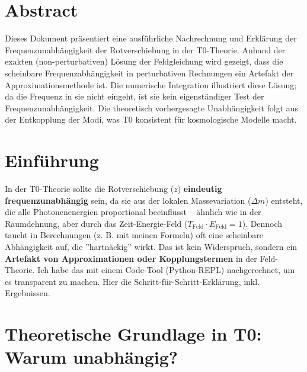 \section*{Abstract}
		Dieses Dokument präsentiert eine ausführliche Nachrechnung und Erklärung der Frequenzunabhängigkeit der Rotverschiebung in der T0-Theorie. Anhand der exakten (non-perturbativen) Lösung der Feldgleichung wird gezeigt, dass die scheinbare Frequenzabhängigkeit in perturbativen Rechnungen ein Artefakt der Approximationsmethode ist. Die numerische Integration illustriert diese Lösung; da die Frequenz in sie nicht eingeht, ist sie kein eigenständiger Test der Frequenzunabhängigkeit. Die theoretisch vorhergesagte Unabhängigkeit folgt aus der Entkopplung der Modi, was T0 konsistent für kosmologische Modelle macht.

	
	
	\section{Einführung}
	
	In der T0-Theorie sollte die Rotverschiebung ($z$) \textbf{eindeutig frequenzunabhängig} sein, da sie aus der lokalen Massevariation ($\Delta m$) entsteht, die alle Photonenenergien proportional beeinflusst -- ähnlich wie in der Raumdehnung, aber durch das Zeit-Energie-Feld ($T_{\mathrm{Feld}} \cdot E_{\mathrm{Feld}} = 1$). Dennoch taucht in Berechnungen (z. B. mit meinen Formeln) oft eine scheinbare Abhängigkeit auf, die ''hartnäckig'' wirkt. Das ist kein Widerspruch, sondern ein \textbf{Artefakt von Approximationen oder Kopplungstermen} in der Feld-Theorie. Ich habe das mit einem Code-Tool (Python-REPL) nachgerechnet, um es transparent zu machen. Hier die Schritt-für-Schritt-Erklärung, inkl. Ergebnissen.
	
	\section{Theoretische Grundlage in T0: Warum unabhängig?}
	
